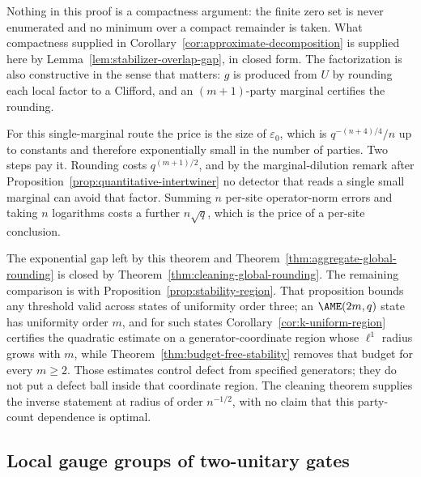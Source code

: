 Nothing in this proof is a compactness argument: the finite zero set is
never enumerated and no minimum over a compact remainder is taken.  What
compactness supplied in Corollary~\ref{cor:approximate-decomposition} is
supplied here by Lemma~\ref{lem:stabilizer-overlap-gap}, in closed form.
The factorization is also constructive in the sense that matters: \(g\) is
produced from \(U\) by rounding each local factor to a Clifford, and an
\((m+1)\)-party marginal certifies the rounding.

For this single-marginal route the price is the size of \(\varepsilon_0\), which is
\(q^{-(n+4)/4}/n\) up to constants and therefore exponentially small in the
number of parties.  Two steps pay it.  Rounding costs \(q^{(m+1)/2}\), and
by the marginal-dilution remark after
Proposition~\ref{prop:quantitative-intertwiner} no detector that reads a
single small marginal can avoid that factor.  Summing \(n\) per-site
operator-norm errors and taking \(n\) logarithms costs a further
\(n\sqrt q\), which is the price of a per-site conclusion.

The exponential gap left by this theorem and
Theorem~\ref{thm:aggregate-global-rounding} is closed by
Theorem~\ref{thm:cleaning-global-rounding}.  The remaining comparison is
with Proposition~\ref{prop:stability-region}.  That proposition bounds
any threshold valid across states of uniformity order three; an
\(\AME(2m,q)\) state has uniformity order \(m\), and for such states
Corollary~\ref{cor:k-uniform-region} certifies the quadratic estimate on a
generator-coordinate region whose \(\ell^1\) radius grows with \(m\), while
Theorem~\ref{thm:budget-free-stability} removes that budget for every
\(m\geq2\).  Those
estimates control defect from specified generators; they do not put a
defect ball inside that coordinate region.  The cleaning theorem supplies
the inverse statement at radius of order \(n^{-1/2}\), with no claim that
this party-count dependence is optimal.

\subsection{Local gauge groups of two-unitary gates}

